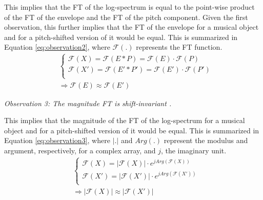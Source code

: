 \documentclass[journal]{IEEEtran}
\begin{document}
This implies that the FT of the log-spectrum is equal to the point-wise product of the FT of the envelope and the FT of the pitch component. Given the first observation, this further implies that the FT of the envelope for a musical object and for a pitch-shifted version of it would be equal. This is summarized in Equation \ref{eq:observation2}, where $\mathcal{F}(.)$ represents the FT function.
\begin{equation}
\label{eq:observation2}
\begin{split}
& \begin{cases}
\mathcal{F}(X) = \mathcal{F}(E * P) = \mathcal{F}(E) \cdot \mathcal{F}(P) \\
\mathcal{F}(X') = \mathcal{F}(E' * P') = \mathcal{F}(E') \cdot \mathcal{F}(P') \\
\end{cases} \\
& \Rightarrow \mathcal{F}(E) \approx \mathcal{F}(E')
\end{split}
\end{equation}

\emph{Observation 3: The magnitude FT is shift-invariant \cite{proakis1995}.}

This implies that the magnitude of the FT of the log-spectrum for a musical object and for a pitch-shifted version of it would be equal. This is summarized in Equation \ref{eq:observation3}, where $|.|$ and $Arg(.)$ represent the modulus and argument, respectively, for a complex array, and $j$, the imaginary unit.
\begin{equation}
\label{eq:observation3}
\begin{split}
& \begin{cases}
\mathcal{F}(X) = |\mathcal{F}(X)| \cdot e^{j Arg(\mathcal{F}(X))} \\
\mathcal{F}(X') = |\mathcal{F}(X')| \cdot e^{j Arg(\mathcal{F}(X'))} \\
\end{cases} \\
& \Rightarrow |\mathcal{F}(X)| \approx |\mathcal{F}(X')|
\end{split}
\end{equation}
\end{document}
